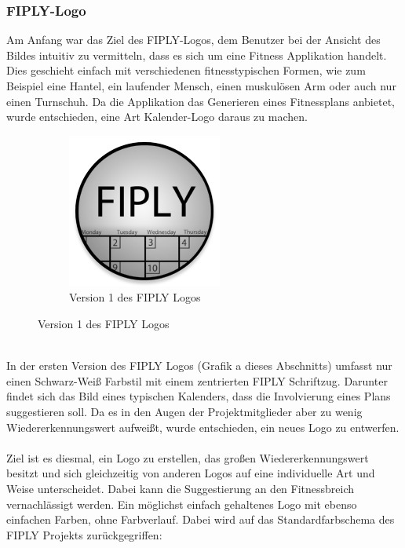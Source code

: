\documentclass[FIPLY_base.tex]{subfiles}
\begin{document}
	\subsubsection{FIPLY-Logo} 
	Am Anfang war das Ziel des FIPLY-Logos, dem Benutzer bei der Ansicht des Bildes intuitiv zu vermitteln, dass es sich um eine Fitness Applikation handelt. Dies geschieht einfach mit verschiedenen fitnesstypischen Formen, wie zum Beispiel eine Hantel, ein laufender Mensch, einen muskulösen Arm oder auch nur einen Turnschuh. Da die Applikation das Generieren eines Fitnessplans anbietet, wurde entschieden, eine Art Kalender-Logo daraus zu machen. 
	\begin{figure}[H]
		\begin{subfigure}[b]{1\textwidth}
			\centering
			\includegraphics[scale=1]{img/icons/Version1}
			\centering
			\caption{Version 1 des FIPLY Logos}
		\end{subfigure}
	\end{figure}
	\ \\
	In der ersten Version des FIPLY Logos (Grafik a dieses Abschnitts) umfasst nur einen Schwarz-Weiß Farbstil mit einem zentrierten \grqq{}FIPLY\grqq{} Schriftzug. Darunter findet sich das Bild eines typischen Kalenders, dass die Involvierung eines Plans suggestieren soll. Da es in den Augen der Projektmitglieder aber zu wenig Wiedererkennungswert aufweißt, wurde entschieden, ein neues Logo zu entwerfen. 
	\ \\
	Ziel ist es diesmal, ein Logo zu erstellen, das großen Wiedererkennungswert besitzt und sich gleichzeitig von anderen Logos auf eine individuelle Art und Weise unterscheidet. Dabei kann die Suggestierung an den Fitnessbreich vernachlässigt werden. Ein möglichst einfach gehaltenes Logo mit ebenso einfachen Farben, ohne Farbverlauf. Dabei wird auf das Standardfarbschema des FIPLY Projekts zurückgegriffen:
\end{document}
